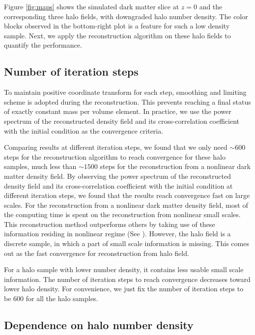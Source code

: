 \documentclass[iop]{emulateapj}
\begin{document}
{Figure \ref{fig:maps} shows the simulated dark matter slice at $z=0$ and the corresponding three halo fields,
with downgraded halo number density.
The color blocks observed in the bottom-right plot is a feature for such a low density sample.
Next, we apply the reconstruction algorithm on these halo fields to quantify the performance.

\subsection{Number of iteration steps}
\label{sec:iteration}

To maintain positive coordinate transform for each step, smoothing and limiting scheme is adopted during the reconstruction.
This prevents reaching a final status of exactly constant mass per volume element.
In practice, we use the power spectrum of the reconstructed density field and its cross-correlation coefficient with the initial condition as the convergence criteria.

Comparing results at different iteration steps, we found that we only need $\sim 600$ steps for the reconstruction algorithm to reach convergence for these halo samples, much less than $\sim 1500$ steps for the reconstruction from a nonlinear dark matter density field.
By observing the power spectrum of the reconstructed density field and its cross-correlation coefficient with the initial condition at different iteration steps, we found that the results reach convergence fast on large scales.
For the reconstruction from a nonlinear dark matter density field, most of the computing time is spent on the reconstruction from nonlinear small scales.
This reconstruction method outperforms others by taking use of these information residing in nonlinear regime (See \cite{zhuhm16c}).
However, the halo field is a discrete sample, in which a part of small scale information is missing. 
This comes out as the fast convergence for reconstruction from halo field.

For a halo sample with lower number density, it contains less usable small scale information.
The number of iteration steps to reach convergence decreases toward lower halo density.
For convenience, we just fix the number of iteration steps to be 600 for all the halo samples.

\subsection{Dependence on halo number density}
\label{sec:numberdensity}

}
\end{document}

